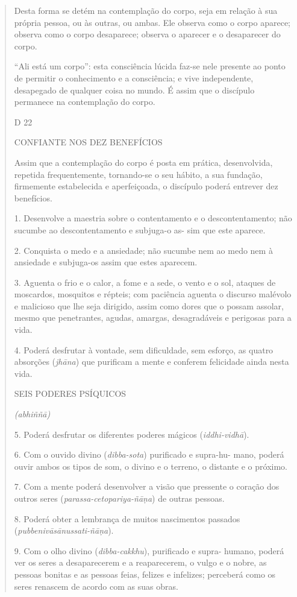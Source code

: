 \begin{quote}
Desta forma se detém na contemplação do corpo, seja em relação à sua própria pessoa, ou às outras, ou ambas. Ele observa como o corpo aparece; observa como o corpo desaparece; observa o aparecer e o desaparecer do corpo.

``Ali está um corpo'': esta consciência lúcida faz-se nele presente ao ponto de permitir o conhecimento e a consciência; e vive independente, desapegado de qualquer coisa no mundo. É assim que o discípulo permanece na contemplação do corpo.

D 22

CONFIANTE NOS DEZ BENEFÍCIOS

Assim que a contemplação do corpo é posta em prática, desenvolvida, repetida frequentemente, tornando-se o seu hábito, a sua fundação, firmemente estabelecida e aperfeiçoada, o discípulo poderá entrever dez benefícios.

1. Desenvolve a maestria sobre o contentamento e o descontentamento; não sucumbe ao descontentamento e subjuga-o as- sim que este aparece.

2. Conquista o medo e a ansiedade; não sucumbe nem ao medo nem à ansiedade e subjuga-os assim que estes aparecem.

3. Aguenta o frio e o calor, a fome e a sede, o vento e o sol, ataques de moscardos, mosquitos e répteis; com paciência aguenta o discurso malévolo e malicioso que lhe seja dirigido, assim como dores que o possam assolar, mesmo que penetrantes, agudas, amargas, desagradáveis e perigosas para a vida.

4. Poderá desfrutar à vontade, sem dificuldade, sem esforço, as quatro absorções (\emph{jhāna}) que purificam a mente e conferem felicidade ainda nesta vida.

SEIS PODERES PSÍQUICOS

\emph{(abhiññā)}

5. Poderá desfrutar os diferentes poderes mágicos (\emph{iddhi-vidhā}).

6. Com o ouvido divino (\emph{dibba-sota}) purificado e supra-hu- mano, poderá ouvir ambos os tipos de som, o divino e o terreno, o distante e o próximo.

7. Com a mente poderá desenvolver a visão que pressente o coração dos outros seres (\emph{parassa-cetopariya-ñāṇa}) de outras pessoas.

8. Poderá obter a lembrança de muitos nascimentos passados (\emph{pubbenivāsānussati-ñāṇa}).

9. Com o olho divino (\emph{dibba-cakkhu}), purificado e supra- humano, poderá ver os seres a desaparecerem e a reaparecerem, o vulgo e o nobre, as pessoas bonitas e as pessoas feias, felizes e infelizes; perceberá como os seres renascem de acordo com as suas obras.


\end{quote}
